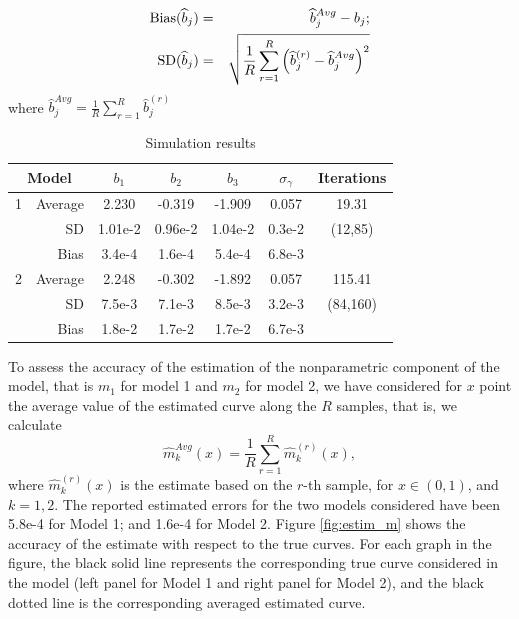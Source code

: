 \documentclass[sn-mathphys]{sn-jnl}%
\theoremstyle{thmstyleone}%
\theoremstyle{thmstyletwo}%
\theoremstyle{thmstylethree}%
\begin{document}
\begin{eqnarray}
	{\rm Bias}(\widehat{b}_j)&=& \widehat{b}_{j}^{Avg}-b_j ;\label{eq:bias_sim}\\
	{\rm SD} (\widehat{b}_j)&=& \sqrt{\frac{1}{R}\sum_{r=1}^R \left(\widehat{b}_j^{(r)}-\widehat{b}_{j}^{Avg}\right)^2} \label{eq:sd_sim} 
\end{eqnarray}
where $\widehat{b}_{j}^{Avg} =\frac{1}{R}\sum_{r=1}^R \widehat{b}_j^{(r)}$
{\small{
		\begin{table}[!t]
			\begin{center}
				\caption{Simulation results}
				\label{tab:simu}
				\begin{tabular}{|r|r|c|c|c|c|c|}\hline
					\multicolumn{2}{|c}{Model}&\multicolumn{1}{|c}{$b_1$}&\multicolumn{1}{|c}{$b_2$}&\multicolumn{1}{|c}{$b_3$}&\multicolumn{1}{|c}{$\sigma_{\gamma}$} & \multicolumn{1}{|c|}{Iterations} \\ \hline
					1        & Average     & 2.230  &-0.319    & -1.909   & 0.057   & 19.31  \\
					& SD           & 1.01e-2 & 0.96e-2 & 1.04e-2  & 0.3e-2  & (12,85)                \\
					& Bias           & 3.4e-4  & 1.6e-4  & 5.4e-4   & 6.8e-3  &                 \\ \hline
					
					2       & Average     & 2.248   &-0.302   & -1.892   & 0.057   & 115.41  \\
					& SD           & 7.5e-3  & 7.1e-3  & 8.5e-3   & 3.2e-3  & (84,160) \\
					& Bias           & 1.8e-2  & 1.7e-2  & 1.7e-2   & 6.7e-3  &           \\ \hline
				\end{tabular}
			\end{center}
		\end{table}
}}

To assess the accuracy of the estimation of the nonparametric component of the model, that is $m_1$ for model 1 and $m_2$ for model 2, we have considered for $x$ point the average value of the estimated curve along the $R$ samples, that is, we calculate
\[
{\widehat{m}}_{k}^{Avg}(x) =\frac{1}{R}\sum_{r=1}^R \widehat{m}_k^{(r)}(x),
\]
where $\widehat{m}_k^{(r)}(x)$ is the estimate based on the $r$-th sample, for $x \in (0,1)$, and $k=1,2$. The reported estimated errors for the two models considered have been  5.8e-4 for Model 1; and 1.6e-4 for Model 2. 
Figure \ref{fig:estim_m} shows the accuracy of the estimate with respect to the true curves. For each graph in the figure, the black solid line represents the corresponding true curve considered in the model (left panel for Model 1 and right panel for Model 2), and the black dotted line is the corresponding averaged estimated curve.
\end{document}
